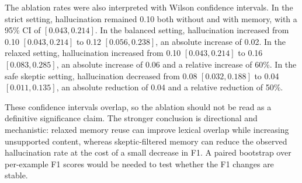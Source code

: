 The ablation rates were also interpreted with Wilson confidence intervals. In the strict setting, hallucination remained 0.10 both without and with memory, with a 95\% CI of \([0.043, 0.214]\). In the balanced setting, hallucination increased from 0.10 \([0.043, 0.214]\) to 0.12 \([0.056, 0.238]\), an absolute increase of 0.02. In the relaxed setting, hallucination increased from 0.10 \([0.043, 0.214]\) to 0.16 \([0.083, 0.285]\), an absolute increase of 0.06 and a relative increase of 60\%. In the safe skeptic setting, hallucination decreased from 0.08 \([0.032, 0.188]\) to 0.04 \([0.011, 0.135]\), an absolute reduction of 0.04 and a relative reduction of 50\%.

These confidence intervals overlap, so the ablation should not be read as a definitive significance claim. The stronger conclusion is directional and mechanistic: relaxed memory reuse can improve lexical overlap while increasing unsupported content, whereas skeptic-filtered memory can reduce the observed hallucination rate at the cost of a small decrease in F1. A paired bootstrap over per-example F1 scores would be needed to test whether the F1 changes are stable.

